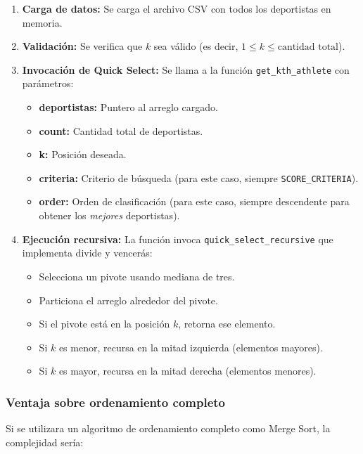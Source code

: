 \begin{enumerate}
    \item \textbf{Carga de datos:} Se carga el archivo CSV con todos los deportistas en memoria.
    
    \item \textbf{Validación:} Se verifica que \(k\) sea válido (es decir, \(1 \leq k \leq \text{cantidad total}\)).
    
    \item \textbf{Invocación de Quick Select:} Se llama a la función \texttt{get\_kth\_athlete} con parámetros:
    \begin{itemize}
        \item \textbf{deportistas:} Puntero al arreglo cargado.
        \item \textbf{count:} Cantidad total de deportistas.
        \item \textbf{k:} Posición deseada.
        \item \textbf{criteria:} Criterio de búsqueda (para este caso, siempre \texttt{SCORE\_CRITERIA}).
        \item \textbf{order:} Orden de clasificación (para este caso, siempre descendente para obtener los \textit{mejores} deportistas).
    \end{itemize}
    
    \item \textbf{Ejecución recursiva:} La función invoca \texttt{quick\_select\_recursive} que implementa divide y vencerás:
    \begin{itemize}
        \item Selecciona un pivote usando mediana de tres.
        \item Particiona el arreglo alrededor del pivote.
        \item Si el pivote está en la posición \(k\), retorna ese elemento.
        \item Si \(k\) es menor, recursa en la mitad izquierda (elementos mayores).
        \item Si \(k\) es mayor, recursa en la mitad derecha (elementos menores).
    \end{itemize}
\end{enumerate}

\subsubsection{Ventaja sobre ordenamiento completo}

Si se utilizara un algoritmo de ordenamiento completo como Merge Sort, la complejidad sería:


